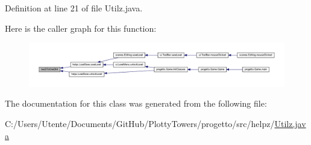 Definition at line 21 of file Utilz.\+java.

Here is the caller graph for this function\+:\nopagebreak
\begin{figure}[H]
\begin{center}
\leavevmode
\includegraphics[width=350pt]{classhelpz_1_1_utilz_a3a92fdb2e1e33fa3daadbdea23200fcc_icgraph}
\end{center}
\end{figure}


The documentation for this class was generated from the following file\+:\begin{DoxyCompactItemize}
\item 
C\+:/\+Users/\+Utente/\+Documents/\+Git\+Hub/\+Plotty\+Towers/progetto/src/helpz/\hyperlink{_utilz_8java}{Utilz.\+java}\end{DoxyCompactItemize}
